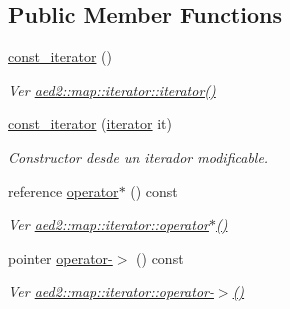 \subsection*{Public Member Functions}
\begin{DoxyCompactItemize}
\item 
\mbox{\label{classaed2_1_1map_1_1const__iterator_a8add3e4cabbdaf313b0e085064491555}} 
\hyperlink{classaed2_1_1map_1_1const__iterator_a8add3e4cabbdaf313b0e085064491555}{const\+\_\+iterator} ()
\begin{DoxyCompactList}\small\item\em Ver \hyperlink{classaed2_1_1map_1_1iterator_acdd790eb54216601a2e0591776004dba}{aed2\+::map\+::iterator\+::iterator()} \end{DoxyCompactList}\item 
\hyperlink{classaed2_1_1map_1_1const__iterator_ab7924d90cbf6d19bec62514d10b62fb3}{const\+\_\+iterator} (\hyperlink{classaed2_1_1map_1_1iterator}{iterator} it)
\begin{DoxyCompactList}\small\item\em Constructor desde un iterador modificable. \end{DoxyCompactList}\item 
\mbox{\label{classaed2_1_1map_1_1const__iterator_a174e7b81e88253d936fb14512f00ef69}} 
reference \hyperlink{classaed2_1_1map_1_1const__iterator_a174e7b81e88253d936fb14512f00ef69}{operator$\ast$} () const
\begin{DoxyCompactList}\small\item\em Ver \hyperlink{classaed2_1_1map_1_1iterator_ab115711d0295146906830840590d900a}{aed2\+::map\+::iterator\+::operator$\ast$()} \end{DoxyCompactList}\item 
\mbox{\label{classaed2_1_1map_1_1const__iterator_a07700cccc763da67d42c84d20f4e1d1b}} 
pointer \hyperlink{classaed2_1_1map_1_1const__iterator_a07700cccc763da67d42c84d20f4e1d1b}{operator-\/$>$} () const
\begin{DoxyCompactList}\small\item\em Ver \hyperlink{classaed2_1_1map_1_1iterator_a712522d62f461c1eb9b02ecf248bae8c}{aed2\+::map\+::iterator\+::operator-\/$>$()} \end{DoxyCompactList}\item 

\end{DoxyCompactItemize}
